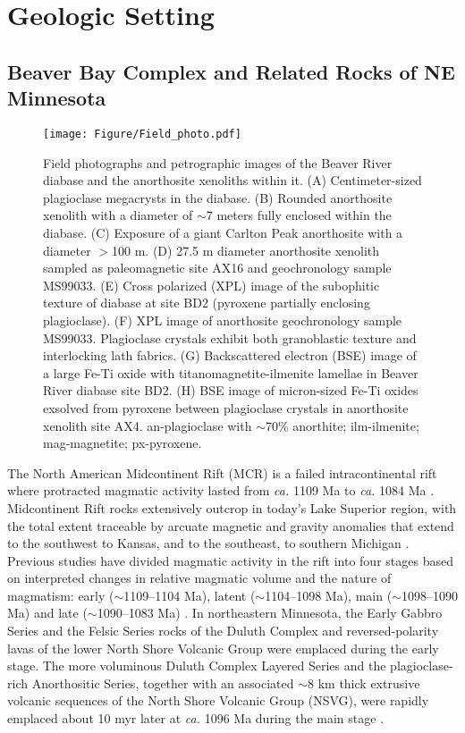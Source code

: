 \section{Geologic Setting}

\subsection{Beaver Bay Complex and Related Rocks of NE Minnesota}

\begin{figure}
\centering
\noindent\texttt{[image: Figure/Field\_photo.pdf]}
\caption{\footnotesize{Field photographs and petrographic images of the Beaver River diabase and the anorthosite xenoliths within it. (A) Centimeter-sized plagioclase megacrysts in the diabase. (B) Rounded anorthosite xenolith with a diameter of $\sim$7 meters fully enclosed within the diabase. (C) Exposure of a giant Carlton Peak anorthosite with a diameter $>$100 m. (D) 27.5 m diameter anorthosite xenolith sampled as paleomagnetic site AX16 and geochronology sample MS99033. (E) Cross polarized (XPL) image of the subophitic texture of diabase at site BD2 (pyroxene partially enclosing plagioclase). (F) XPL image of anorthosite geochronology sample MS99033. Plagioclase crystals exhibit both granoblastic texture and interlocking lath fabrics. (G) Backscattered electron (BSE) image of a large Fe-Ti oxide with titanomagnetite-ilmenite lamellae in Beaver River diabase site BD2. (H) BSE image of micron-sized Fe-Ti oxides exsolved from pyroxene between plagioclase crystals in anorthosite xenolith site AX4. an-plagioclase with $\sim$70\% anorthite; ilm-ilmenite; mag-magnetite; px-pyroxene.}}
\label{fig:Field_photo}
\end{figure}

The North American Midcontinent Rift (MCR) is a failed intracontinental rift where protracted magmatic activity lasted from \textit{ca.} 1109 Ma to \textit{ca.} 1084 Ma \cite{Swanson-Hysell2019a}. Midcontinent Rift rocks extensively outcrop in today's Lake Superior region, with the total extent traceable by arcuate magnetic and gravity anomalies that extend to the southwest to Kansas, and to the southeast, to southern Michigan \cite{Hinze2020a}. Previous studies have divided magmatic activity in the rift into four stages based on interpreted changes in relative magmatic volume and the nature of magmatism: early ($\sim$1109–1104 Ma), latent ($\sim$1104–1098 Ma), main ($\sim$1098–1090 Ma) and late ($\sim$1090–1083 Ma) \cite{Vervoort2007a, Heaman2007a, Miller2013a}. In northeastern Minnesota, the Early Gabbro Series and the Felsic Series rocks of the Duluth Complex and reversed-polarity lavas of the lower North Shore Volcanic Group were emplaced during the early stage. The more voluminous Duluth Complex Layered Series and the plagioclase-rich Anorthositic Series, together with an associated $\sim$8 km thick extrusive volcanic sequences of the North Shore Volcanic Group (NSVG), were rapidly emplaced about 10 myr later at \textit{ca.} 1096 Ma during the main stage \cite{Paces1993a, Swanson-Hysell2020a}. 

